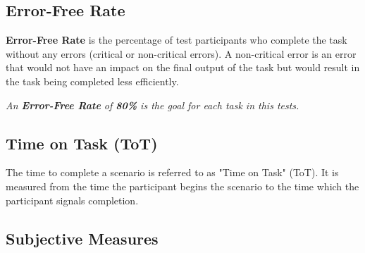 \hfill


\clearpage


\subsection{Error-Free Rate}

\textbf{Error-Free Rate} is the percentage of test participants who complete the task without any errors (critical or non-critical errors). A non-critical error is an error that would not have an impact on the final output of the task but would result in the task being completed less efficiently.


\hfill

\textit{An \textbf{Error-Free Rate} of \textbf{80\%} is the goal for each task in this tests.}

\hfill



\subsection{Time on Task (ToT)}

The time to complete a scenario is referred to as "Time on Task" (ToT). It is measured from the time the participant begins the scenario to the time which the participant signals completion.


\subsection{Subjective Measures}

